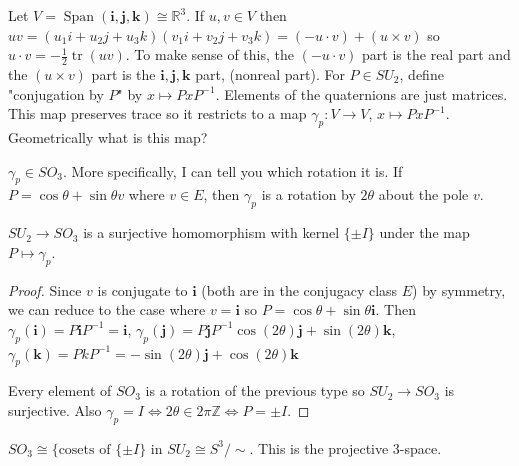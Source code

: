 \documentclass{article}
\newcommand{\R}{\mathbb{R}}
\newcommand{\Z}{\mathbb{Z}}
\newcommand{\ra}[1][]{\xrightarrow{#1}}
\DeclareMathOperator{\Span}{Span}
\DeclareMathOperator{\tr}{tr}
\begin{document}
Let $V=\Span(\mathbf i, \mathbf j,\mathbf k)\cong \R^3$. If $u,v\in V$ then $uv=(u_1i+u_2j+u_3k)(v_1i+v_2j+v_3k)=(-u\cdot v)+(u\times v)$ so $u\cdot v=-\frac{1}{2}\tr(uv)$. To make sense of this, the $(-u\cdot v)$ part is the real part and the $(u\times v)$ part is the $\mathbf i,\mathbf j,\mathbf k$ part, (nonreal part). For $P\in SU_2$, define "conjugation by $P$" by $x\mapsto PxP^{-1}$. Elements of the quaternions are just matrices. This map preserves trace so it restricts to a map $\gamma_p:V\ra V$, $x\mapsto PxP^{-1}$. Geometrically what is this map? 
\begin{theorem}
$\gamma_p\in SO_3$. More specifically, I can tell you which rotation it is. If $P=\cos\theta+\sin\theta v$ where $v\in E$, then $\gamma_p$ is a rotation by $2\theta$ about the pole $v$.

$SU_2\ra SO_3$ is a surjective homomorphism with kernel $\{\pm I\}$ under the map $P\mapsto \gamma_p$.
\end{theorem}
\begin{proof}
Since $v$ is conjugate to $\mathbf i$ (both are in the conjugacy class $E$) by symmetry, we can reduce to the case where $v=\mathbf i$ so $P=\cos\theta+\sin\theta\mathbf i$. Then $\gamma_p(\mathbf i)=P\mathbf i P^{-1}=\mathbf i$, $\gamma_p(\mathbf j)=P\mathbf j P^{-1}\cos(2\theta)\mathbf j +\sin(2\theta)\mathbf k$, $\gamma_p(\mathbf k)=PkP^{-1}=-\sin(2\theta)\mathbf j +\cos(2\theta)\mathbf k$

Every element of $SO_3$ is a rotation of the previous type so $SU_2\ra SO_3$ is surjective. Also $\gamma_p=I\iff 2\theta\in 2\pi \Z\iff P=\pm I$.
\end{proof}
\begin{corollary}
$SO_3\cong \{\textrm{cosets of }\{\pm I\}\textrm{ in }SU_2\cong S^3/\sim$. This is the projective 3-space.
\end{corollary}
\end{document}
